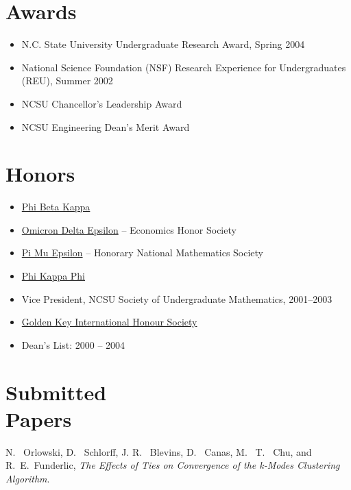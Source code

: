 \documentclass[margin,line,11pt,draft]{res}
\begin{document}
\begin{resume}
\section{\sc Awards}
\begin{itemize}
\item N.C. State University Undergraduate Research Award, Spring 2004
\item National Science Foundation (NSF) Research Experience for
  Undergraduates (REU), Summer 2002
\item NCSU Chancellor's Leadership Award %
\item NCSU Engineering Dean's Merit Award %
\end{itemize}

\section{\sc Honors}
\begin{itemize}
\item \href{http://www.pbk.org/}{Phi Beta Kappa}
\item \href{http://www.cba.ua.edu/~ode/}
  {Omicron Delta Epsilon} -- Economics Honor Society
\item \href{http://www.pme-math.org/}
  {Pi Mu Epsilon} -- Honorary National Mathematics Society
\item \href{http://www.phikappaphi.org/}{Phi Kappa Phi}
\item Vice President, NCSU Society of Undergraduate Mathematics, 2001--2003
\item \href{www.goldenkey.org}{Golden Key International Honour Society}
\item Dean's List: 2000 -- 2004
\end{itemize}




\section{\sc Submitted \\Papers}

N. \ Orlowski, D. \ Schlorff, J. R. \ Blevins, D. \ Canas, M. \ T. \ Chu,
and R.\ E.\ Funderlic, {\em The Effects of Ties on Convergence of the
k-Modes Clustering Algorithm}.  %


\end{resume}
\end{document}
